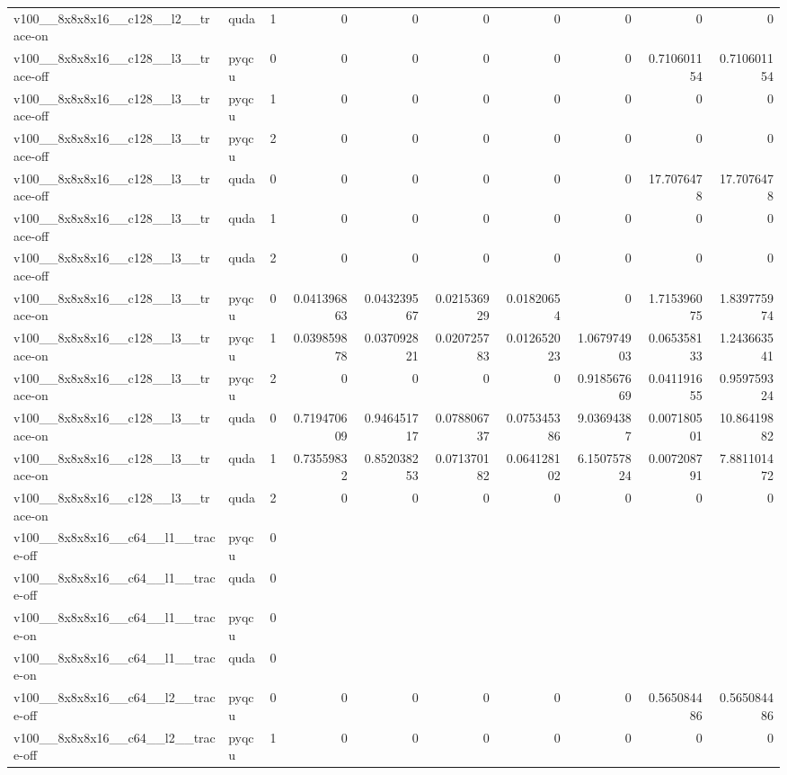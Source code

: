 \begin{table}[htbp]
\begin{tabular}{@{}llrrrrrrrr@{}}
v100\_\_8x8x8x16\_\_c128\_\_l2\_\_trace-on & quda & 1 & 0 & 0 & 0 & 0 & 0 & 0 & 0 \\
v100\_\_8x8x8x16\_\_c128\_\_l3\_\_trace-off & pyqcu & 0 & 0 & 0 & 0 & 0 & 0 & 0.710601154 & 0.710601154 \\
v100\_\_8x8x8x16\_\_c128\_\_l3\_\_trace-off & pyqcu & 1 & 0 & 0 & 0 & 0 & 0 & 0 & 0 \\
v100\_\_8x8x8x16\_\_c128\_\_l3\_\_trace-off & pyqcu & 2 & 0 & 0 & 0 & 0 & 0 & 0 & 0 \\
v100\_\_8x8x8x16\_\_c128\_\_l3\_\_trace-off & quda & 0 & 0 & 0 & 0 & 0 & 0 & 17.7076478 & 17.7076478 \\
v100\_\_8x8x8x16\_\_c128\_\_l3\_\_trace-off & quda & 1 & 0 & 0 & 0 & 0 & 0 & 0 & 0 \\
v100\_\_8x8x8x16\_\_c128\_\_l3\_\_trace-off & quda & 2 & 0 & 0 & 0 & 0 & 0 & 0 & 0 \\
v100\_\_8x8x8x16\_\_c128\_\_l3\_\_trace-on & pyqcu & 0 & 0.041396863 & 0.043239567 & 0.021536929 & 0.01820654 & 0 & 1.715396075 & 1.839775974 \\
v100\_\_8x8x8x16\_\_c128\_\_l3\_\_trace-on & pyqcu & 1 & 0.039859878 & 0.037092821 & 0.020725783 & 0.012652023 & 1.067974903 & 0.065358133 & 1.243663541 \\
v100\_\_8x8x8x16\_\_c128\_\_l3\_\_trace-on & pyqcu & 2 & 0 & 0 & 0 & 0 & 0.918567669 & 0.041191655 & 0.959759324 \\
v100\_\_8x8x8x16\_\_c128\_\_l3\_\_trace-on & quda & 0 & 0.719470609 & 0.946451717 & 0.078806737 & 0.075345386 & 9.03694387 & 0.007180501 & 10.86419882 \\
v100\_\_8x8x8x16\_\_c128\_\_l3\_\_trace-on & quda & 1 & 0.73559832 & 0.852038253 & 0.071370182 & 0.064128102 & 6.150757824 & 0.007208791 & 7.881101472 \\
v100\_\_8x8x8x16\_\_c128\_\_l3\_\_trace-on & quda & 2 & 0 & 0 & 0 & 0 & 0 & 0 & 0 \\
v100\_\_8x8x8x16\_\_c64\_\_l1\_\_trace-off & pyqcu & 0 &  &  &  &  &  &  &  \\
v100\_\_8x8x8x16\_\_c64\_\_l1\_\_trace-off & quda & 0 &  &  &  &  &  &  &  \\
v100\_\_8x8x8x16\_\_c64\_\_l1\_\_trace-on & pyqcu & 0 &  &  &  &  &  &  &  \\
v100\_\_8x8x8x16\_\_c64\_\_l1\_\_trace-on & quda & 0 &  &  &  &  &  &  &  \\
v100\_\_8x8x8x16\_\_c64\_\_l2\_\_trace-off & pyqcu & 0 & 0 & 0 & 0 & 0 & 0 & 0.565084486 & 0.565084486 \\
v100\_\_8x8x8x16\_\_c64\_\_l2\_\_trace-off & pyqcu & 1 & 0 & 0 & 0 & 0 & 0 & 0 & 0 \\

\end{tabular}
\end{table}
